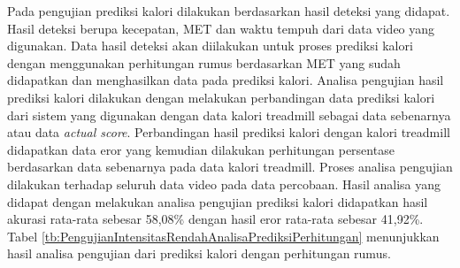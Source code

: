 Pada pengujian prediksi kalori dilakukan berdasarkan hasil deteksi yang didapat. Hasil deteksi berupa kecepatan, MET dan waktu tempuh dari data video yang digunakan. Data hasil deteksi akan diilakukan untuk proses prediksi kalori dengan menggunakan perhitungan rumus berdasarkan MET yang sudah didapatkan dan menghasilkan data pada prediksi kalori. Analisa pengujian hasil prediksi kalori dilakukan dengan melakukan perbandingan data prediksi kalori dari sistem yang digunakan dengan data kalori treadmill sebagai data sebenarnya atau data \emph{actual score}. Perbandingan hasil prediksi kalori dengan kalori treadmill didapatkan data eror yang kemudian dilakukan perhitungan persentase berdasarkan data sebenarnya pada data kalori treadmill. Proses analisa pengujian dilakukan terhadap seluruh data video pada data percobaan. Hasil analisa yang didapat dengan melakukan analisa pengujian prediksi kalori didapatkan hasil akurasi rata-rata sebesar 58,08\% dengan hasil eror rata-rata sebesar 41,92\%. Tabel \ref{tb:PengujianIntensitasRendahAnalisaPrediksiPerhitungan} menunjukkan hasil analisa pengujian dari prediksi kalori dengan perhitungan rumus.


